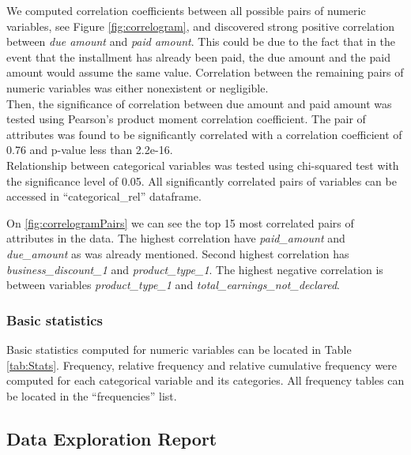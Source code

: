 \documentclass[
]{article}
\begin{document}
We computed correlation coefficients between all possible pairs of numeric variables, see Figure \ref{fig:correlogram}, and discovered strong positive correlation between \emph{due amount} and \emph{paid amount}. This could be due to the fact that in the event that the installment has already been paid, the due amount and the paid amount would assume the same value. Correlation between the remaining pairs of numeric variables was either nonexistent or negligible.\\
Then, the significance of correlation between due amount and paid amount was tested using Pearson's product moment correlation coefficient. The pair of attributes was found to be significantly correlated with a correlation coefficient of 0.76 and p-value less than 2.2e-16.\\
Relationship between categorical variables was tested using chi-squared test with the significance level of 0.05. All significantly correlated pairs of variables can be accessed in ``categorical\_rel'' dataframe.

On \ref{fig:correlogramPairs} we can see the top 15 most correlated pairs of attributes in the data. The highest correlation have \emph{paid\_amount} and \emph{due\_amount} as was already mentioned. Second highest correlation has \emph{business\_discount\_1} and \emph{product\_type\_1}. The highest negative correlation is between variables \emph{product\_type\_1} and \emph{total\_earnings\_not\_declared}.

\hypertarget{basic-statistics}{%
\subsubsection{Basic statistics}\label{basic-statistics}}

Basic statistics computed for numeric variables can be located in Table \ref{tab:Stats}. Frequency, relative frequency and relative cumulative frequency were computed for each categorical variable and its categories. All frequency tables can be located in the ``frequencies'' list.

\hypertarget{data-exploration-report}{%
\subsection{Data Exploration Report}\label{data-exploration-report}}
\end{document}
